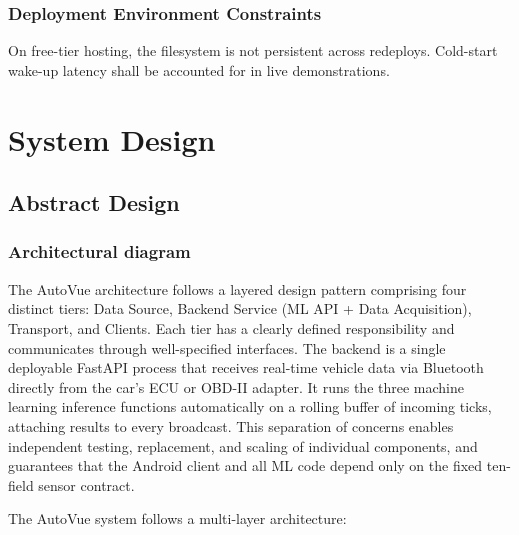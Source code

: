\documentclass[10pt,a4paper]{report}
\begin{document}
\subsection{Deployment Environment Constraints}
On free-tier hosting, the filesystem is not persistent across redeploys. Cold-start wake-up latency shall be accounted for in live demonstrations. \par


\chapter{System Design}
\section{Abstract Design}
\subsection{Architectural diagram}
The AutoVue architecture follows a layered design pattern comprising four distinct tiers:
Data Source, Backend Service (ML API + Data Acquisition), Transport, and Clients. Each tier has a clearly defined responsibility and communicates through well-specified interfaces. The backend is a single deployable FastAPI process that receives real-time vehicle data via Bluetooth directly from the car's ECU or OBD-II adapter. It runs the three machine learning inference functions automatically on a rolling buffer of incoming ticks, attaching results to every broadcast. This separation of concerns enables independent testing, replacement, and scaling of individual components, and guarantees that the Android client and all ML code depend only on the fixed ten-field sensor contract.

The AutoVue system follows a multi-layer architecture:
\end{document}
